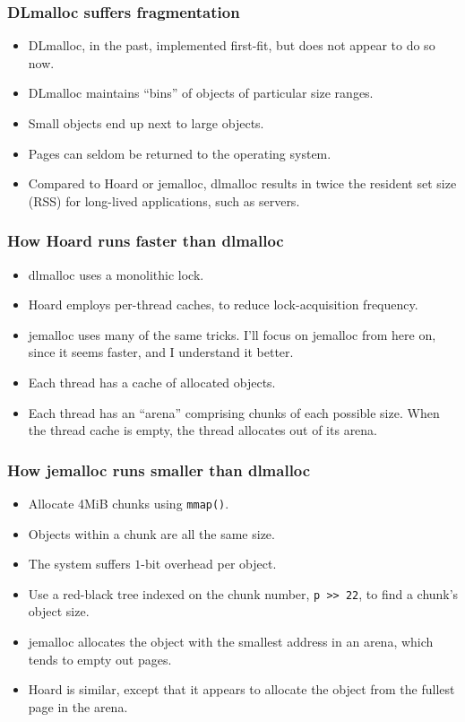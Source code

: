\documentclass[xcolor=dvipsnames,14pt]{beamer}
\begin{document}
\begin{frame}
\frametitle{DLmalloc suffers fragmentation}

\begin{itemize}
\item DLmalloc, in the past, implemented first-fit, but does not appear to do so now.

\item DLmalloc maintains ``bins'' of objects of particular size ranges.

\item Small objects end up next to large objects.

\item Pages can seldom be returned to the operating system.

\item Compared to Hoard or jemalloc, dlmalloc results in twice the
  resident set size (RSS) for long-lived applications, such as
  servers.
\end{itemize}

\end{frame}

\begin{frame}
\frametitle{How Hoard runs faster than dlmalloc}

\begin{itemize}
\item dlmalloc uses a monolithic lock.
\item Hoard employs per-thread caches, to reduce lock-acquisition frequency.
\item jemalloc uses many of the same tricks.  I'll focus on jemalloc
  from here on, since it seems faster, and I understand it better.
\item Each thread has a cache of allocated objects.
\item Each thread has an ``arena'' comprising chunks of each possible size.  When the thread cache is empty, the thread allocates out of its arena.
\end{itemize}

\end{frame}

\begin{frame}
\frametitle{How jemalloc runs smaller than dlmalloc}

\begin{itemize}
\item Allocate 4MiB chunks using \texttt{mmap()}.
\item Objects within a chunk are all the same size. 
\item The system suffers $1$-bit overhead per object.
\item Use a red-black tree indexed on the chunk number, \texttt{p >> 22}, to find a chunk's object size.
\item jemalloc allocates the object with the smallest address in an arena,
which tends to empty out pages.
\item Hoard is similar, except that it appears to allocate the object from the fullest page in the arena.
\end{itemize}
\end{frame}
\end{document}
